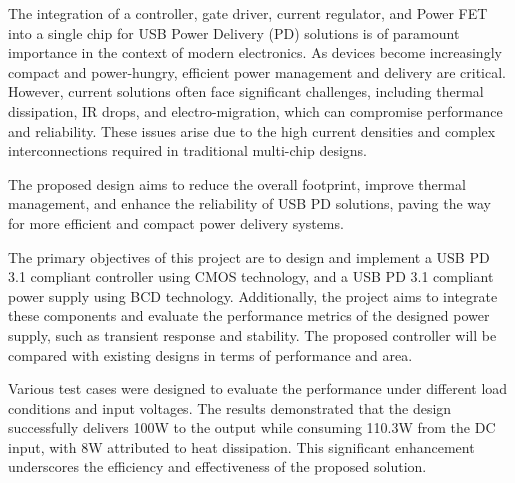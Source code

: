\vspace{-1cm}



The integration of a controller, gate driver, current regulator, and Power FET into a single chip for USB Power Delivery (PD) solutions is of paramount importance in the context of modern electronics. As devices become increasingly compact and power-hungry, efficient power management and delivery are critical. However, current solutions often face significant challenges, including thermal dissipation, IR drops, and electro-migration, which can compromise performance and reliability. These issues arise due to the high current densities and complex interconnections required in traditional multi-chip designs. 

\vspace{10pt}

The proposed design aims to reduce the overall footprint, improve thermal management, and enhance the reliability of USB PD solutions, paving the way for more efficient and compact power delivery systems.

\vspace{10pt}

The primary objectives of this project are to design and implement a USB PD 3.1 compliant controller using CMOS technology, and a USB PD 3.1 compliant power supply using BCD technology. Additionally, the project aims to integrate these components and evaluate the performance metrics of the designed power supply, such as transient response and stability. The proposed controller will be compared with existing designs in terms of performance and area.

\vspace{10pt}

Various test cases were designed to evaluate the performance under different load conditions and input voltages. The results demonstrated that the design successfully delivers 100W to the output while consuming 110.3W from the DC input, with 8W attributed to heat dissipation. This significant enhancement underscores the efficiency and effectiveness of the proposed solution.

\pagebreak